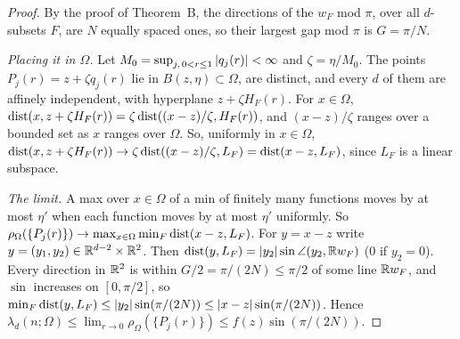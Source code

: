 \begin{proof}
By the proof of Theorem~B, the directions of the $w_F$ mod $\pi$, over all $d$-subsets $F$, are $N$
equally spaced ones, so their largest gap mod $\pi$ is $G=\pi/N$.

\emph{Placing it in $\Omega$.} Let $M_0=\sup_{j,\,0<r\le1}\left|q_j(r)\right|<\infty$ and $\zeta=\eta/M_0$. The
points $P_j(r)=z+\zeta q_j(r)$ lie in $B(z,\eta)\subset \Omega$, are distinct, and every $d$ of them are
affinely independent, with hyperplane $z+\zeta H_F(r)$. For $x\in \Omega$,
$\operatorname{dist}(x,z+\zeta H_F(r))=\zeta\operatorname{dist}((x-z)/\zeta,H_F(r))$, and $(x-z)/\zeta$ ranges over a bounded set
as $x$ ranges over $\Omega$. So, uniformly in $x\in \Omega$,
$\operatorname{dist}(x,z+\zeta H_F(r))\to\zeta\operatorname{dist}((x-z)/\zeta,L_F)=\operatorname{dist}(x-z,L_F)$, since $L_F$ is a linear
subspace.

\emph{The limit.} A max over $x\in \Omega$ of a min of finitely many functions moves by at most $\eta'$ when
each function moves by at most $\eta'$ uniformly. So
$\rho_\Omega(\{P_j(r)\})\to\max_{x\in \Omega}\min_F\operatorname{dist}(x-z,L_F)$. For $y=x-z$ write
$y=(y_1,y_2)\in\mathbb{R}^{d-2}\times\mathbb{R}^2$. Then $\operatorname{dist}(y,L_F)=\left|y_2\right|\sin\angle(y_2,\mathbb{R} w_F)$ ($0$ if
$y_2=0$). Every direction in $\mathbb{R}^2$ is within $G/2=\pi/(2N)\le\pi/2$ of some line $\mathbb{R} w_F$, and $\sin$
increases on $[0,\pi/2]$, so $\min_F\operatorname{dist}(y,L_F)\le\left|y_2\right|\sin(\pi/(2N))\le\left|x-z\right|\sin(\pi/(2N))$.
Hence $\lambda_d(n;\Omega)\le\lim_{r\to0}\rho_\Omega(\{P_j(r)\})\le f(z)\sin(\pi/(2N))$.


\end{proof}
